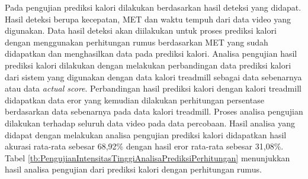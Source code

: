 Pada pengujian prediksi kalori dilakukan berdasarkan hasil deteksi yang didapat. Hasil deteksi berupa kecepatan, MET dan waktu tempuh dari data video yang digunakan. Data hasil deteksi akan diilakukan untuk proses prediksi kalori dengan menggunakan perhitungan rumus berdasarkan MET yang sudah didapatkan dan menghasilkan data pada prediksi kalori. Analisa pengujian hasil prediksi kalori dilakukan dengan melakukan perbandingan data prediksi kalori dari sistem yang digunakan dengan data kalori treadmill sebagai data sebenarnya atau data \emph{actual score}. Perbandingan hasil prediksi kalori dengan kalori treadmill didapatkan data eror yang kemudian dilakukan perhitungan persentase berdasarkan data sebenarnya pada data kalori treadmill. Proses analisa pengujian dilakukan terhadap seluruh data video pada data percobaan. Hasil analisa yang didapat dengan melakukan analisa pengujian prediksi kalori didapatkan hasil akurasi rata-rata sebesar 68,92\% dengan hasil eror rata-rata sebesar 31,08\%. Tabel \ref{tb:PengujianIntensitasTinggiAnalisaPrediksiPerhitungan} menunjukkan hasil analisa pengujian dari prediksi kalori dengan perhitungan rumus.

